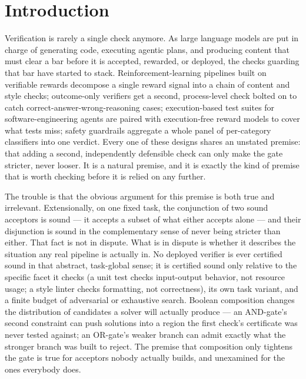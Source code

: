 \documentclass[11pt]{article}
\begin{document}
\section{Introduction}

Verification is rarely a single check anymore. As large language models are put in charge of generating code, executing agentic plans, and producing content that must clear a bar before it is accepted, rewarded, or deployed, the checks guarding that bar have started to stack. Reinforcement-learning pipelines built on verifiable rewards decompose a single reward signal into a chain of content and style checks; outcome-only verifiers get a second, process-level check bolted on to catch correct-answer-wrong-reasoning cases; execution-based test suites for software-engineering agents are paired with execution-free reward models to cover what tests miss; safety guardrails aggregate a whole panel of per-category classifiers into one verdict. Every one of these designs shares an unstated premise: that adding a second, independently defensible check can only make the gate stricter, never looser. It is a natural premise, and it is exactly the kind of premise that is worth checking before it is relied on any further.

The trouble is that the obvious argument for this premise is both true and irrelevant. Extensionally, on one fixed task, the conjunction of two sound acceptors is sound --- it accepts a subset of what either accepts alone --- and their disjunction is sound in the complementary sense of never being stricter than either. That fact is not in dispute. What is in dispute is whether it describes the situation any real pipeline is actually in. No deployed verifier is ever certified sound in that abstract, task-global sense; it is certified sound only relative to the specific facet it checks (a unit test checks input-output behavior, not resource usage; a style linter checks formatting, not correctness), its own task variant, and a finite budget of adversarial or exhaustive search. Boolean composition changes the distribution of candidates a solver will actually produce --- an AND-gate's second constraint can push solutions into a region the first check's certificate was never tested against; an OR-gate's weaker branch can admit exactly what the stronger branch was built to reject. The premise that composition only tightens the gate is true for acceptors nobody actually builds, and unexamined for the ones everybody does.
\end{document}
